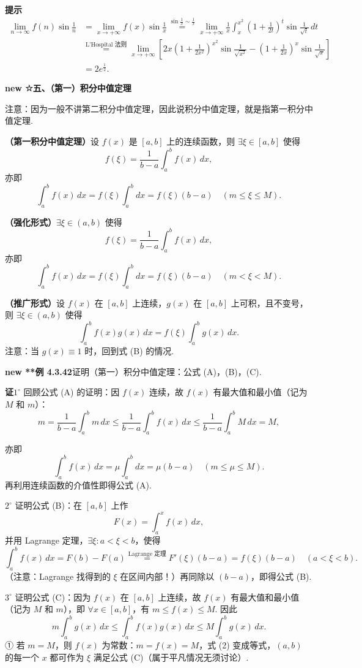 \documentclass[UTF8,12pt,a4paper,fontset=fandol]{ctexart}
\begin{document}
\noindent\textbf{提示}\quad
\[
\begin{aligned}
\lim_{n\to\infty}f(n)\sin\frac1n
&=\lim_{x\to+\infty}f(x)\sin\frac1x
\overset{\sin\frac1x\sim\frac1x}{=}
\lim_{x\to+\infty}\frac1x\int_x^{x^2}
\left(1+\frac1{2t}\right)^t\sin\frac1{\sqrt{t}}\,dt\\
&\overset{\text{L'Hospital 法则}}{=}
\lim_{x\to+\infty}\left[
2x\left(1+\frac1{2x^2}\right)^{x^2}\sin\frac1{\sqrt{x^2}}
-\left(1+\frac1{2x}\right)^x\sin\frac1{\sqrt{x}}\right]\\
&=2e^{\frac12}.
\end{aligned}
\]

\noindent\textbf{new ☆五、（第一）积分中值定理}

注意：因为一般不讲第二积分中值定理，因此说积分中值定理，就是指第一积分中值定理.

\noindent\textbf{（第一积分中值定理）}\quad 设 $f(x)$ 是 $[a,b]$ 上的连续函数，则 $\exists\xi\in[a,b]$ 使得
\[
f(\xi)=\frac1{b-a}\int_a^b f(x)\,dx,
\tag{A}
\]
亦即
\[
\int_a^b f(x)\,dx=f(\xi)\int_a^b dx=f(\xi)(b-a)\quad(m\le\xi\le M).
\]

\noindent\textbf{（强化形式）}\quad $\exists\xi\in(a,b)$ 使得
\[
f(\xi)=\frac1{b-a}\int_a^b f(x)\,dx,
\tag{B}
\]
亦即
\[
\int_a^b f(x)\,dx=f(\xi)\int_a^b dx=f(\xi)(b-a)\quad(m<\xi<M).
\]

\noindent\textbf{（推广形式）}\quad 设 $f(x)$ 在 $[a,b]$ 上连续，$g(x)$ 在 $[a,b]$ 上可积，且不变号，则 $\exists\xi\in(a,b)$ 使得
\[
\int_a^b f(x)g(x)\,dx=f(\xi)\int_a^b g(x)\,dx.
\tag{C}
\]
注意：当 $g(x)\equiv1$ 时，回到式 (B) 的情况.

\noindent\textbf{new **例 4.3.42}\quad 证明（第一）积分中值定理：公式 (A)，(B)，(C).

\noindent\textbf{证}\quad $1^\circ$ 回顾公式 (A) 的证明：因 $f(x)$ 连续，故 $f(x)$ 有最大值和最小值（记为 $M$ 和 $m$）：
\[
m=\frac1{b-a}\int_a^b m\,dx
\le\frac1{b-a}\int_a^b f(x)\,dx
\le\frac1{b-a}\int_a^b M\,dx=M,
\tag{1}
\]

亦即
\[
\int_a^b f(x)\,dx=\mu\int_a^b dx=\mu(b-a)\quad(m\le\mu\le M).
\]
再利用连续函数的介值性即得公式 (A).

$2^\circ$ 证明公式 (B)：在 $[a,b]$ 上作
\[
F(x)=\int_a^x f(x)\,dx,
\]
并用 Lagrange 定理，$\exists\xi:a<\xi<b$，使得
\[
\int_a^b f(x)\,dx=F(b)-F(a)\stackrel{\text{Lagrange 定理}}{=}F'(\xi)(b-a)
=f(\xi)(b-a)\quad(a<\xi<b).
\]
（注意：Lagrange 找得到的 $\xi$ 在区间内部！）再同除以 $(b-a)$，即得公式 (B).

$3^\circ$ 证明公式 (C)：因为 $f(x)$ 在 $[a,b]$ 上连续，故 $f(x)$ 有最大值和最小值（记为 $M$ 和 $m$），即 $\forall x\in[a,b]$，有 $m\le f(x)\le M$. 因此
\[
m\int_a^b g(x)\,dx\le\int_a^b f(x)g(x)\,dx\le M\int_a^b g(x)\,dx.
\tag{2}
\]
① 若 $m=M$，则 $f(x)$ 为常数：$m=f(x)=M$，式 (2) 变成等式，$(a,b)$ 的每一个 $x$ 都可作为 $\xi$ 满足公式 (C)（属于平凡情况无须讨论）.
\end{document}
